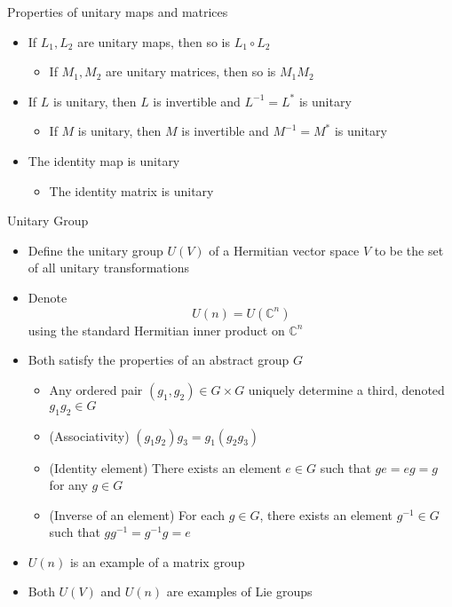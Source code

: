 \documentclass[usenames,dvipsnames,10pt]{beamer}
\newcommand\C{\mathbb{C}}
\begin{document}
\begin{frame}
  {Properties of unitary maps and matrices}

  \begin{itemize}
  \item If $L_1, L_2$ are unitary maps, then so is $L_1\circ L_2$
    \begin{itemize}
    \item If $M_1, M_2$ are unitary matrices, then so is $M_1M_2$
    \end{itemize}
  \item If $L$ is unitary, then $L$ is invertible and $L^{-1}= L^*$ is unitary
    \begin{itemize}
    \item If $M$ is unitary, then $M$ is invertible and $M^{-1} = M^*$ is unitary
    \end{itemize}
  \item The identity map is unitary
    \begin{itemize}
    \item The identity matrix is unitary
    \end{itemize}
  \end{itemize}
\end{frame}

\begin{frame}
  {Unitary Group}

  \begin{itemize}
  \item Define the unitary group $U(V)$ of a Hermitian vector space $V$ to be the set of all unitary transformations
  \item Denote
    \[
      U(n) = U(\C^n)
    \]
    using the standard Hermitian inner product on $\C^n$
  \item Both satisfy the properties of an abstract group $G$
    \begin{itemize}
    \item Any ordered pair $(g_1, g_2) \in G \times G$ uniquely determine a third, denoted $g_1g_2 \in G$
    \item (Associativity) $(g_1g_2)g_3 = g_1(g_2g_3)$
    \item (Identity element) There exists an element $e \in G$ such that $ge = eg = g$ for any $g \in G$
    \item (Inverse of an element) For each $g \in G$, there exists an element $g^{-1} \in G$ such that $gg^{-1} = g^{-1}g = e$
    \end{itemize}
  \item $U(n)$ is an example of a matrix group
  \item Both $U(V)$ and $U(n)$ are examples of Lie groups
  \end{itemize}
\end{frame}
\end{document}
